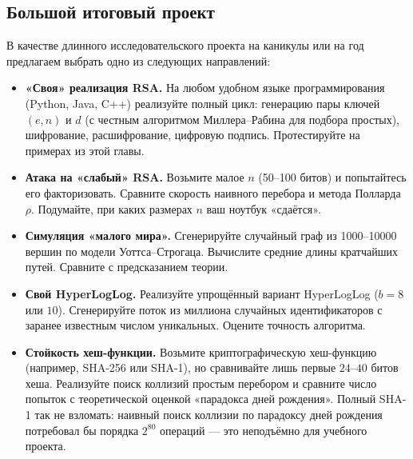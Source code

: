 \subsection*{Большой итоговый проект}

В качестве длинного исследовательского проекта на каникулы или на год предлагаем выбрать одно из следующих направлений:

\begin{itemize}
  \item \textbf{«Своя» реализация RSA.} На любом удобном языке программирования (Python, Java, C++) реализуйте полный цикл: генерацию пары ключей $(e, n)$ и $d$ (с честным алгоритмом Миллера--Рабина для подбора простых), шифрование, расшифрование, цифровую подпись. Протестируйте на примерах из этой главы.
  \item \textbf{Атака на «слабый» RSA.} Возьмите малое $n$ (50--100 битов) и попытайтесь его факторизовать. Сравните скорость наивного перебора и метода Полларда $\rho$. Подумайте, при каких размерах $n$ ваш ноутбук «сдаётся».
  \item \textbf{Симуляция «малого мира».} Сгенерируйте случайный граф из 1000--10000 вершин по модели Уоттса--Строгаца. Вычислите средние длины кратчайших путей. Сравните с предсказанием теории.
  \item \textbf{Свой HyperLogLog.} Реализуйте упрощённый вариант HyperLogLog ($b = 8$ или $10$). Сгенерируйте поток из миллиона случайных идентификаторов с заранее известным числом уникальных. Оцените точность алгоритма.
  \item \textbf{Стойкость хеш-функции.} Возьмите криптографическую хеш-функцию (например, SHA-256 или SHA-1), но сравнивайте лишь первые $24$--$40$ битов хеша. Реализуйте поиск коллизий простым перебором и сравните число попыток с теоретической оценкой «парадокса дней рождения». Полный SHA-1 так не взломать: наивный поиск коллизии по парадоксу дней рождения потребовал бы порядка $2^{80}$ операций --- это неподъёмно для учебного проекта.
\end{itemize}

